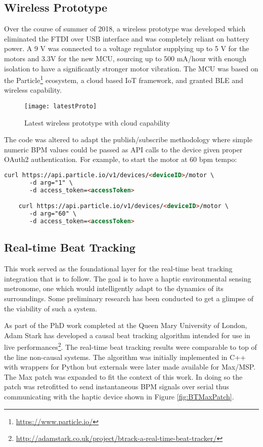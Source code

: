 \subsection{Wireless Prototype}\label{wirelessHP}
Over the course of summer of 2018, a wireless prototype was developed which eliminated the FTDI over USB interface and was completely reliant on battery power. A 9 V was connected to a voltage regulator supplying up to 5 V for the motors and 3.3V for the new MCU, sourcing up to 500 mA/hour with enough isolation to have a significantly stronger motor vibration. The MCU was based on the Particle\footnote{\url{https://www.particle.io/}} ecosystem, a cloud based IoT framework, and granted BLE and wireless capability.
\begin{figure}[H]
    \centering
    \texttt{[image: latestProto]}
    \caption{Latest wireless prototype with cloud capability}
\end{figure}
The code was altered to adapt the publish/subscribe methodology where simple numeric BPM values could be passed as API calls to the device given proper OAuth2 authentication. For example, to start the motor at 60 bpm tempo:
\begin{lstlisting}[language=html]
    curl https://api.particle.io/v1/devices/<deviceID>/motor \
       -d arg="1" \
       -d access_token=<accessToken>

    curl https://api.particle.io/v1/devices/<deviceID>/motor \
       -d arg="60" \
       -d access_token=<accessToken>
\end{lstlisting}

\subsection{Real-time Beat Tracking}
This work served as the foundational layer for the real-time beat tracking integration that is to follow. The goal is to have a haptic environmental sensing metronome, one which would intelligently adapt to the dynamics of its surroundings. Some preliminary research has been conducted to get a glimpse of the viability of such a system.

As part of the PhD work completed at the Queen Mary University of London, Adam Stark has developed a causal beat tracking algorithm intended for use in live performances\footnote{\url{http://adamstark.co.uk/project/btrack-a-real-time-beat-tracker/}}\cite{stark2009real}. The real-time beat tracking results were comparable to top of the line non-causal systems. The algorithm was initially implemented in C++ with wrappers for Python but externals were later made available for Max/MSP.
The Max patch was expanded to fit the context of this work. In doing so the patch was retrofitted to send instantaneous BPM signals over serial thus communicating with the haptic device shown in Figure \ref{fig:BTMaxPatch}.

